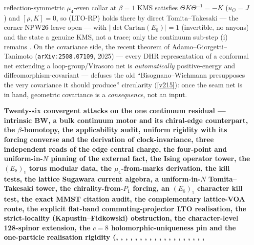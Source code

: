 \documentclass[11pt,a4paper]{article}
\begin{document}
\begin{keybox}
reflection-symmetric $\mu_4$-even collar at $\beta{=}1$ KMS satisfies $\Theta K\Theta^{-1}{=}{-}K$
($u_\Theta{=}J$) and $[\rho,K]{=}0$, so (LTO-RP) holds there by direct Tomita--Takesaki --- the corner NPW26
leave open --- with $|\!\det\mathrm{Cartan}(E_8)|{=}1$ (invertible, no anyons) and the state a genuine KMS,
not a trace; only the continuum sub-step (i) remains \mO. On the covariance side, the recent theorem of
Adamo--Giorgetti--Tanimoto (\texttt{arXiv:2508.07109}, 2025) --- every DHR representation of a conformal net
extending a loop-group/Virasoro net is \emph{automatically} positive-energy and diffeomorphism-covariant ---
defuses the old ``Bisognano--Wichmann presupposes the very covariance it should produce'' circularity (\vref{v215}):
once the seam net is in hand, geometric covariance is a \emph{consequence}, not an input.
\par\smallskip\noindent\textbf{Twenty-six convergent attacks on the one continuum residual --- intrinsic BW, a
bulk continuum motor and its chiral-edge counterpart, the $\beta$-homotopy, the applicability audit, uniform
rigidity with its forcing converse and the derivation of clock-invariance, three independent reads of the edge
central charge, the four-point and uniform-in-$N$ pinning of the external fact, the Ising operator tower, the
$(E_8)_1$ torus modular data, the $\mu_4$-from-marks derivation, the kill tests, the lattice Sugawara current
algebra, a uniform-in-$N$ Tomita--Takesaki tower, the chirality-from-$P_1$ forcing, an $(E_8)_1$ character kill
test, the exact MMST citation audit, the complementary lattice-VOA route, the explicit flat-band
commuting-projector LTO realisation, the strict-locality (Kapustin--Fidkowski) obstruction, the character-level
128-spinor extension, the $c{=}8$ holomorphic-uniqueness pin and the one-particle realisation rigidity
(, , ,
, ,
, ,
, ,
, ,
, ,
, ,
, ,
, ,
}
\end{keybox}
\end{document}
